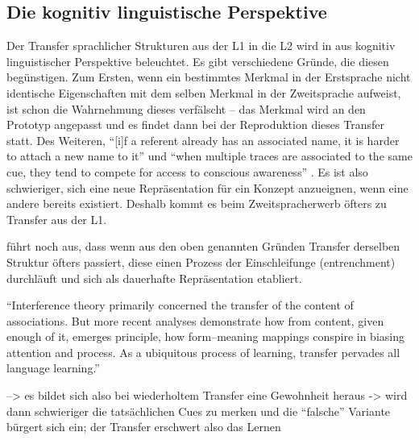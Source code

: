\subsection{Die kognitiv linguistische Perspektive}
Der Transfer sprachlicher Strukturen aus der L1 in die L2 wird in \cite{Ellis06} aus kognitiv linguistischer Perspektive beleuchtet.
Es gibt verschiedene Gründe, die diesen begünstigen.
Zum Ersten, wenn ein bestimmtes Merkmal in der Erstsprache nicht identische Eigenschaften mit dem selben Merkmal in der Zweitsprache aufweist, ist schon die Wahrnehmung dieses verfälscht -- das Merkmal wird an den Prototyp angepasst und es findet dann bei der Reproduktion dieses Transfer statt.
Des Weiteren, ``[i]f a referent already has an associated name, it is harder to attach a new name to it'' und
``when multiple traces are associated to the same cue, they tend to compete for access to conscious awareness'' \cite{Ellis06}.
Es ist also schwieriger, sich eine neue Repräsentation für ein Konzept anzueignen, wenn eine andere bereits existiert.
Deshalb kommt es beim Zweitspracherwerb öfters zu Transfer aus der L1.

\cite{Ellis06} führt noch aus, dass wenn aus den oben genannten Gründen Transfer derselben Struktur öfters passiert, diese einen Prozess der Einschleifunge (entrenchment) durchläuft und sich als dauerhafte Repräsentation etabliert.






\cite{Ellis06} ``Interference theory primarily concerned the transfer of the content of
associations. But more recent analyses demonstrate how from content, given
enough of it, emerges principle, how form–meaning mappings conspire in
biasing attention and process. As a ubiquitous process of learning, transfer
pervades all language learning.''

--> es bildet sich also bei wiederholtem Transfer eine Gewohnheit heraus -> wird dann schwieriger die tatsächlichen Cues zu merken und die ``falsche'' Variante bürgert sich ein;
der Transfer erschwert also das Lernen

